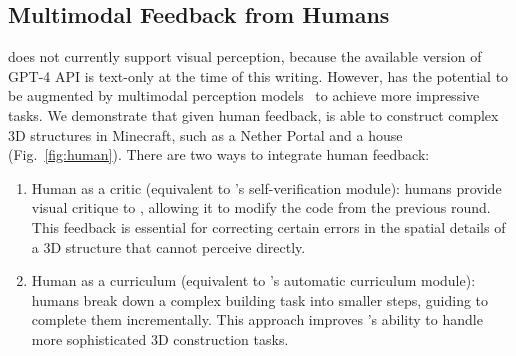 \subsection{Multimodal Feedback from Humans}
\voyager does not currently support visual perception, because the available version of GPT-4 API is text-only at the time of this writing. However, \voyager has the potential to be augmented by multimodal perception models~\cite{liu2023prismer,driess2023palme} to achieve more impressive tasks. We demonstrate that given human feedback, \voyager is able to construct complex 3D structures in Minecraft, such as a Nether Portal and a house (Fig.~\ref{fig:human}). There are two ways to integrate human feedback: 
\begin{enumerate}[label=(\arabic*)]
    \item Human as a critic (equivalent to \voyager's self-verification module): humans provide visual critique to \voyager, allowing it to modify the code from the previous round. This feedback is essential for correcting certain errors in the spatial details of a 3D structure that \voyager cannot perceive directly.
    \item Human as a curriculum (equivalent to \voyager's automatic curriculum module): humans break down a complex building task into smaller steps, guiding \voyager to complete them incrementally. This approach improves \voyager's ability to handle more sophisticated 3D construction tasks.
\end{enumerate}